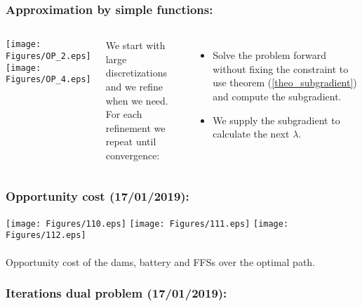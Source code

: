{
\begin{frame}[noframenumbering]
\frametitle{Approximation by simple functions:}

\begin{columns}[c] %

\texttt{[image: Figures/OP\_2.eps]}\\
\texttt{[image: Figures/OP\_4.eps]}

We start with large discretizations and we refine when we need.\\
For each refinement we repeat until convergence:
\begin{itemize}

\item Solve the problem forward without fixing the constraint to use theorem (\ref{theo_subgradient}) and compute the subgradient.

\item We supply the subgradient to calculate the next $\lambda$.

\end{itemize}

\end{columns}
\end{frame}
}


{
\begin{frame}[noframenumbering]\frametitle{Opportunity cost (17/01/2019):}
\centering
\texttt{[image: Figures/110.eps]}\quad
\texttt{[image: Figures/111.eps]}\quad
\texttt{[image: Figures/112.eps]}\\
\quad\\
Opportunity cost of the dams, battery and FFSs over the optimal path.
\end{frame}
}


{
\begin{frame}[noframenumbering]\frametitle{Iterations dual problem (17/01/2019):}
\begin{figure}[ht!]
\centering
{}\quad
\end{figure}
\end{frame}
}


